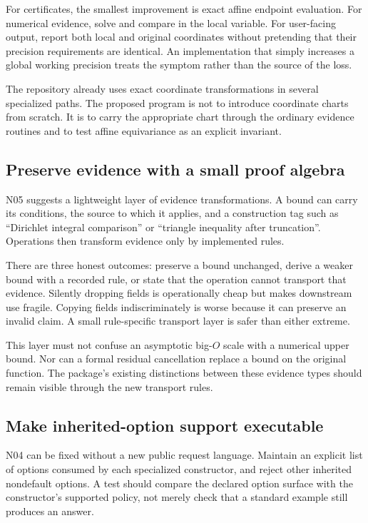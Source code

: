 \documentclass[11pt,a4paper]{article}
\begin{document}
For certificates, the smallest improvement is exact affine endpoint evaluation. For numerical evidence, solve and compare in the local variable. For user-facing output, report both local and original coordinates without pretending that their precision requirements are identical. An implementation that simply increases a global working precision treats the symptom rather than the source of the loss.

The repository already uses exact coordinate transformations in several specialized paths. The proposed program is not to introduce coordinate charts from scratch. It is to carry the appropriate chart through the ordinary evidence routines and to test affine equivariance as an explicit invariant.\cite{source-coordinates,gamma-checks,numerical,certificates}

\subsection{Preserve evidence with a small proof algebra}

N05 suggests a lightweight layer of evidence transformations. A bound can carry its conditions, the source to which it applies, and a construction tag such as ``Dirichlet integral comparison'' or ``triangle inequality after truncation''. Operations then transform evidence only by implemented rules.

There are three honest outcomes: preserve a bound unchanged, derive a weaker bound with a recorded rule, or state that the operation cannot transport that evidence. Silently dropping fields is operationally cheap but makes downstream use fragile. Copying fields indiscriminately is worse because it can preserve an invalid claim. A small rule-specific transport layer is safer than either extreme.

This layer must not confuse an asymptotic big-$O$ scale with a numerical upper bound. Nor can a formal residual cancellation replace a bound on the original function. The package's existing distinctions between these evidence types should remain visible through the new transport rules.

\subsection{Make inherited-option support executable}

N04 can be fixed without a new public request language. Maintain an explicit list of options consumed by each specialized constructor, and reject other inherited nondefault options. A test should compare the declared option surface with the constructor's supported policy, not merely check that a standard example still produces an answer.
\end{document}
